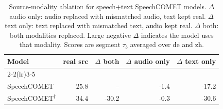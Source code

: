 \begin{table}[t]
\centering
\footnotesize
\setlength{\tabcolsep}{4pt}
\begin{tabular}{l|rrrr}
\toprule
\textbf{Model} & \textbf{real src} & \textbf{$\Delta$ both} & \textbf{$\Delta$ audio only} & \textbf{$\Delta$ text only} \\
\cmidrule(lr){2-2}\cmidrule(lr){3-5}
\multicolumn{5}{l}{\textit{Segment $\tau_b$ avg (\%) over de \& zh}} \\
\midrule
SpeechCOMET & \cellcolor[RGB]{255,255,255}25.8 & \cellcolor[RGB]{220,230,245}-- & \cellcolor[RGB]{251,252,253}-1.4 & \cellcolor[RGB]{208,224,240}-17.2 \\
SpeechCOMET$^\dagger$ & \cellcolor[RGB]{183,224,223}34.4 & \cellcolor[RGB]{173,201,228}-30.2 & \cellcolor[RGB]{254,254,254}-0.3 & \cellcolor[RGB]{172,200,228}-30.6 \\
\bottomrule
\end{tabular}
\caption{Source-modality ablation for speech+text SpeechCOMET models. $\Delta$ audio only: audio replaced with mismatched audio, text kept real. $\Delta$ text only: text replaced with mismatched text, audio kept real. $\Delta$ both: both modalities replaced. Large negative $\Delta$ indicates the model uses that modality. Scores are segment $\tau_b$ averaged over de and zh.}\label{tab:source_ablation}
\end{table}
